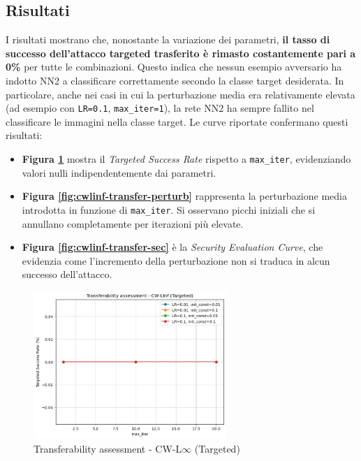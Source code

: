         \subsection{Risultati}
            I risultati mostrano che, nonostante la variazione dei parametri, \textbf{il tasso di successo dell'attacco targeted trasferito è rimasto costantemente pari a 0\%} per tutte le combinazioni. Questo indica che nessun esempio avversario ha indotto NN2 a classificare correttamente secondo la classe target desiderata.
            In particolare, anche nei casi in cui la perturbazione media era relativamente elevata (ad esempio con \texttt{LR=0.1}, \texttt{max\_iter=1}), la rete NN2 ha sempre fallito nel classificare le immagini nella classe target. Le curve riportate confermano questi risultati:
                \begin{itemize}
                  \item \textbf{Figura \ref{fig:cwlinf-transfer-accuracy}} mostra il \textit{Targeted Success Rate} rispetto a \texttt{max\_iter}, evidenziando valori nulli indipendentemente dai parametri.
                  
                  \item \textbf{Figura \ref{fig:cwlinf-transfer-perturb}} rappresenta la perturbazione media introdotta in funzione di \texttt{max\_iter}. Si osservano picchi iniziali che si annullano completamente per iterazioni più elevate.
                  
                  \item \textbf{Figura \ref{fig:cwlinf-transfer-sec}} è la \textit{Security Evaluation Curve}, che evidenzia come l'incremento della perturbazione non si traduca in alcun successo dell’attacco.
                \end{itemize}
            
            \begin{figure}[H]
              \centering
              \includegraphics[width=0.65\textwidth]{images/cwlinf_transfer_accuracy.png}
              \caption{Transferability assessment - CW-L$\infty$ (Targeted)}
              \label{fig:cwlinf-transfer-accuracy}
            \end{figure}
            
